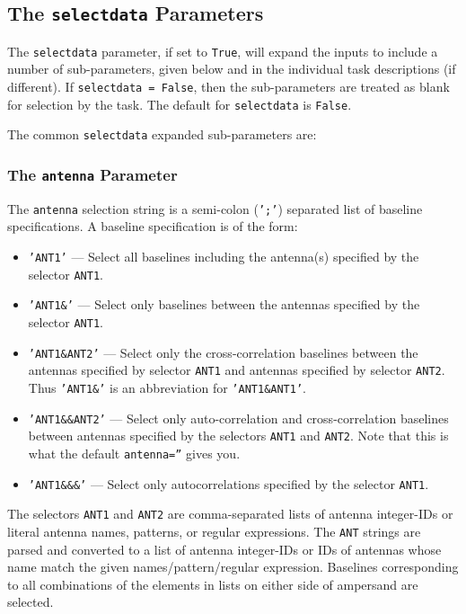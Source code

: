 \subsection{The {\tt selectdata} Parameters}
\label{section:io.selection.selectdata}

The {\tt selectdata} parameter, if set to {\tt True}, will expand
the inputs to include a number of sub-parameters, given below and
in the individual task descriptions (if different).  If 
{\tt selectdata = False}, then the sub-parameters are treated as
blank for selection by the task.  The default for {\tt selectdata} 
is {\tt False}.

The common {\tt selectdata} expanded sub-parameters are:

\subsubsection{The {\tt antenna} Parameter}
\label{section:io.selection.selectdata.antenna}

The {\tt antenna} selection string is a semi-colon ({\tt ';'}) 
separated list of baseline specifications. 
A baseline specification is of the form:
\begin{itemize}

\item {\tt 'ANT1'} --- Select all baselines including the antenna(s)
    specified by the selector {\tt ANT1}.

\item {\tt 'ANT1\&'} --- Select only baselines between the antennas
     specified by the selector {\tt ANT1}.

\item {\tt 'ANT1\&ANT2'} --- Select only the cross-correlation
     baselines between the
     antennas specified by selector {\tt ANT1} and antennas specified
     by selector {\tt ANT2}.  Thus {\tt 'ANT1\&'} is an abbreviation for
     {\tt 'ANT1\&ANT1'}.

\item {\tt 'ANT1\&\&ANT2'} --- Select only auto-correlation and
     cross-correlation baselines between antennas specified by
     the selectors {\tt ANT1} and {\tt ANT2}.  Note that this
     is what the default {\tt antenna=''} gives you.

\item {\tt 'ANT1\&\&\&'} --- Select only autocorrelations specified by
     the selector {\tt ANT1}. 

\end{itemize}
The selectors {\tt ANT1} and {\tt ANT2} are comma-separated lists of
antenna integer-IDs or literal antenna names, patterns, or regular
expressions.  The {\tt ANT} strings are parsed and converted to a list
of antenna integer-IDs or IDs of antennas whose name match the given
names/pattern/regular expression.  Baselines corresponding to all
combinations of the elements in lists on either side of ampersand are
selected.

